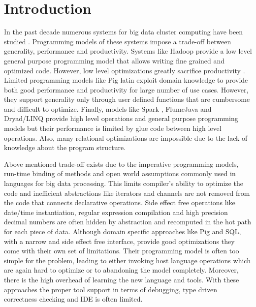 \section{Introduction}
\label{sec:introduction}

In the past decade numerous systems for big data cluster computing have been studied \cite{dean_mapreduce:_2008, yu_dryadlinq:_2008-1, olston_pig_2008-1, thusoo_hive_2010-1, zaharia_spark:_2010}. Programming models of these systems impose a trade-off between generality, performance and productivity. Systems like Hadoop \cite{_hadoop_????} provide a low level general purpose programming model that allows writing fine grained and optimized code.  However, low level optimizations greatly sacrifice productivity \cite{chambers_flumejava:_2010}. Limited programming models like Pig latin \cite{olston_pig_2008-1} exploit domain knowledge to provide both good performance and productivity for large number of use cases. However, they support generality only through user defined functions that are cumbersome and difficult to optimize. Finally, models like Spark \cite{zaharia_spark:_2010}, FlumeJava \cite{chambers_flumejava:_2010} and Dryad/LINQ \cite{yu_dryadlinq:_2008-1} provide high level operations and general purpose programming models but their performance is limited by glue code between high level operations. Also, many relational optimizations are impossible due to the lack of knowledge about the program structure. 

Above mentioned trade-off exists due to the imperative programming models, run-time binding of methods and open world assumptions commonly used in languages for big data processing. This limits compiler's ability to optimize the code and inefficient abstractions like iterators and channels are not removed from the code that connects declarative operations. Side effect free operations like date/time instantiation, regular expression compilation and high precision decimal numbers are often hidden by abstraction and recomputed in the hot path for each piece of data. Although domain specific approaches like Pig and SQL, with a narrow and side effect free interface, provide good optimizations they come with their own set of limitations. Their programming model is often too simple for the problem, leading to either invoking host language operations which are again hard to optimize or to abandoning the model completely. Moreover, there is the high overhead of learning the new language and tools. With these approaches the proper tool support in terms of debugging, type driven correctness checking and IDE is often limited.     

